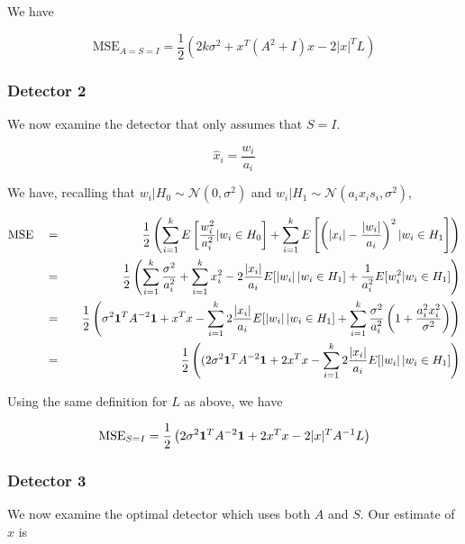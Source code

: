 \documentclass[english]{article}
\begin{document}
We have

\begin{equation}
\text{MSE}_{A=S=I} = \frac{1}{2}\left(2k\sigma^2 +x^T(A^2+I)x -2|x|^TL\right)
\end{equation}

\subsubsection{Detector 2}
We now examine the detector that only assumes that $S=I$.

\begin{equation}
\hat{x}_i = \frac{w_i}{a_i}
\end{equation}

We have, recalling that $w_i|H_0\sim\mathcal{N}(0,\sigma^2)$ and $w_i|H_1\sim\mathcal{N}(a_ix_is_i,\sigma^2)$,

\begin{equation}
\begin{aligned}
&\text{MSE}
&&=
&&&\frac{1}{2}\left(\sum_{i=1}^kE\left[\frac{w_i^2}{a_i^2}|w_i\in H_0\right] + \sum_{i=1}^kE\left[\left(|x_i|-\frac{|w_i|}{a_i}\right)^2| w_i\in H_1\right]\right)\\
&&&=
&&&\frac{1}{2}\left(\sum_{i=1}^k\frac{\sigma^2}{a_i^2} +\sum_{i=1}^kx_i^2-2\frac{|x_i|}{a_i}E[|w_i|\,| w_i\in H_1] +\frac{1}{a_i^2}E[w_i^2|w_i\in H_1]\right)\\
&&&=
&&&\frac{1}{2}\left(\sigma^2\mathbf 1^TA^{-2}\mathbf 1 +x^Tx - \sum_{i=1}^k2\frac{|x_i|}{a_i}E[|w_i|\,| w_i\in H_1] + \sum_{i=1}^k\frac{\sigma^2}{a_i^2}\left(1+\frac{a_i^2x_i^2}{\sigma^2}\right) \right)\\
&&&=
&&&\frac{1}{2}\left((2\sigma^2\mathbf 1^TA^{-2}\mathbf 1 + 2x^Tx - \sum_{i=1}^k2\frac{|x_i|}{a_i}E[|w_i|\,| w_i\in H_1]\right)\\
\end{aligned}
\end{equation}

Using the same definition for $L$ as above, we have

\begin{equation}
\text{MSE}_{S=I} = \frac{1}{2}\left(2\sigma^2\mathbf 1^TA^{-2}\mathbf 1 + 2x^Tx -2|x|^TA^{-1}L\right)
\end{equation}

\subsubsection{Detector 3}
We now examine the optimal detector which uses both $A$ and $S$. Our estimate of $x$ is
\end{document}
